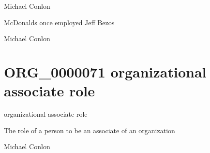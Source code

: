 \documentclass[letterpaper,10pt,english]{sphinxmanual}
\begin{document}
\begin{sphinxShadowBox}

\sphinxAtStartPar
Michael Conlon 
\end{sphinxShadowBox}

\begin{sphinxShadowBox}

\sphinxAtStartPar
McDonalds once employed Jeff Bezos
\end{sphinxShadowBox}

\begin{sphinxShadowBox}

\sphinxAtStartPar
Michael Conlon 
\end{sphinxShadowBox}
\begin{quote}
\label{\detokenize{doc-ORG_0000071:org-0000071}}\label{\detokenize{doc-ORG_0000071:organizational-associate-role}}\label{\detokenize{doc-ORG_0000071:org-0000071}}
\ignorespaces \end{quote}


\section{ORG\_0000071 \sphinxhyphen{} organizational associate role}
\label{\detokenize{doc-ORG_0000071:org-0000071-organizational-associate-role}}\label{\detokenize{doc-ORG_0000071:index-0}}\label{\detokenize{doc-ORG_0000071::doc}}
\begin{sphinxShadowBox}

\sphinxAtStartPar
organizational associate role
\end{sphinxShadowBox}

\begin{sphinxShadowBox}

\sphinxAtStartPar
The role of a person to be an associate of an organization
\end{sphinxShadowBox}

\begin{sphinxShadowBox}

\sphinxAtStartPar
Michael Conlon 
\end{sphinxShadowBox}
\end{document}
